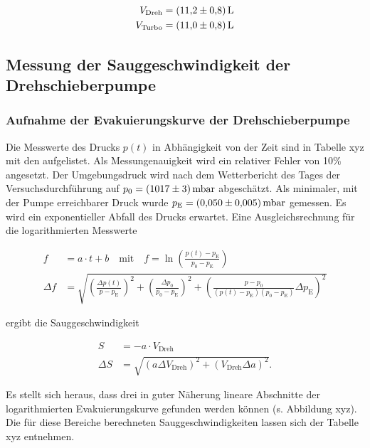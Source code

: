 		\begin{align}
			V_\text{Dreh} &= \SI{11.2+-0.8}{\litre}\\
			V_\text{Turbo} &= \SI{11.0+-0.8}{\litre}
		\end{align}
		
		
		
	\subsection{Messung der Sauggeschwindigkeit der Drehschieberpumpe}
		
		\subsubsection{Aufnahme der Evakuierungskurve der Drehschieberpumpe}
			
			Die Messwerte des Drucks $p(t)$ in Abhängigkeit von der Zeit sind in Tabelle xyz mit den aufgelistet. Als Messungenauigkeit wird ein relativer Fehler von 10\% angesetzt. Der Umgebungsdruck wird nach dem Wetterbericht des Tages der Versuchsdurchführung \cite{wetter} auf $p_0 = \SI{1017 +-3}{\milli \bar}$ abgeschätzt. Als minimaler, mit der Pumpe erreichbarer Druck wurde $p_\text{E} = \SI{0.05+-0.005}{\milli \bar}$ gemessen. Es wird ein exponentieller Abfall des Drucks erwartet. Eine Ausgleichsrechnung für die logarithmierten Messwerte
			
			\begin{align}
				f &= a \cdot t + b \quad \text{mit} \quad f = \ln \left(\frac{p(t) -p_\text{E}}{p_0 - p_\text{E}}\right)\\
				\Delta f &= \sqrt{\left(\frac{\Delta p(t)}{p-p_\text{E}}\right)^2 + \left(\frac{\Delta p_0}{p_0 - p_\text{E}}\right)^2 + \left(\frac{p- p_0}{(p(t) - p_\text{E}) (p_0 - p_\text{E})} \Delta p_\text{E}\right)^2}
			\end{align}
			
			ergibt die Sauggeschwindigkeit
			
			\begin{align}
				S &= - a \cdot V_\text{Dreh}\\
				\Delta S &= \sqrt{\left(a \Delta V_\text{Dreh}\right)^2 + \left(V_\text{Dreh} \Delta a\right)^2}.
			\end{align}
			
			Es stellt sich heraus, dass drei in guter Näherung lineare Abschnitte der logarithmierten Evakuierungskurve gefunden werden können (s. Abbildung xyz). Die für diese Bereiche berechneten Sauggeschwindigkeiten lassen sich der Tabelle xyz entnehmen.
			
